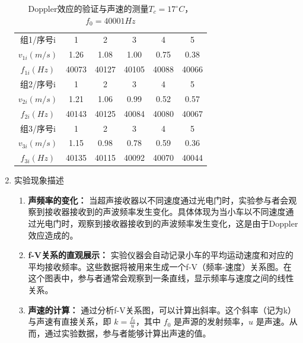 \documentclass[dvipsnames, svgnames,a4paper,11pt]{article}
\begin{document}
\begin{enumerate}
		\begin{table}[h]
			\centering
			\caption{Doppler效应的验证与声速的测量$T_c=17^\circ C$，$f_0=40001Hz$}
			\label{tab:tab1}
			\begin{tabular}{|c|c|c|c|c|c|}
				\hline
				组1/序号i & 1 & 2 & 3 & 4 & 5 \\
				$v_{1i}(m/s)$ & 1.26 & 1.08 & 1.00 & 0.75 & 0.38 \\
				$f_{1i}(Hz)$ & 40073 & 40127 & 40105 & 40088 & 40066 \\
				\hline
				组2/序号i & 1 & 2 & 3 & 4 & 5 \\
				$v_{2i}(m/s)$ & 1.21 & 1.06 & 0.99 & 0.52 & 0.57 \\
				$f_{2i}(Hz)$ & 40143 & 40125 & 40084 & 40080 & 40067 \\
				\hline
				组3/序号i & 1 & 2 & 3 & 4 & 5 \\
				$v_{3i}(m/s)$ & 1.15 & 0.98 & 0.78 & 0.59 & 0.36 \\
				$f_{3i}(Hz)$ & 40135 & 40115 & 40092 & 40070 & 40044 \\
				\hline
			\end{tabular}
		\end{table}
		
		
		\item 实验现象描述
		\begin{enumerate}
			\item \textbf{声频率的变化：}
			当超声接收器以不同速度通过光电门时，实验参与者会观察到接收器接收到的声波频率发生变化。具体体现为当小车以不同速度通过光电门时，观察到接收器接收到的声波频率发生变化，这是由于Doppler效应造成的。
			
			\item \textbf{f-V关系的直观展示：}
			实验仪器会自动记录小车的平均运动速度和对应的平均接收频率。这些数据将被用来生成一个f-V（频率-速度）关系图。在这个图表中，参与者通常会观察到一条直线，显示频率与速度之间的线性关系。
			
			\item \textbf{声速的计算：}
			通过分析f-V关系图，可以计算出斜率。这个斜率（记为k）与声速有直接关系，即 \( k = \frac{f_0}{u} \)，其中 \( f_0 \) 是声源的发射频率，\( u \) 是声速。从而，通过实验数据，参与者能够计算出声速的值。
		\end{enumerate}		
		
	\end{enumerate}
	
\end{document}
